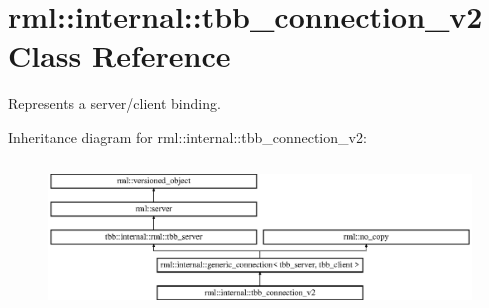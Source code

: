 \hypertarget{classrml_1_1internal_1_1tbb__connection__v2}{}\section{rml\+:\+:internal\+:\+:tbb\+\_\+connection\+\_\+v2 Class Reference}
\label{classrml_1_1internal_1_1tbb__connection__v2}


Represents a server/client binding.  


Inheritance diagram for rml\+:\+:internal\+:\+:tbb\+\_\+connection\+\_\+v2\+:\begin{figure}[H]
\begin{center}
\leavevmode
\includegraphics[height=3.988604cm]{classrml_1_1internal_1_1tbb__connection__v2}
\end{center}
\end{figure}
